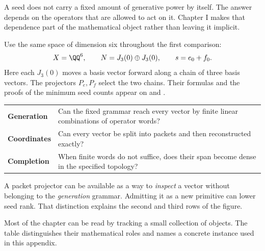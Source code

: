 
A seed does not carry a fixed amount of generative power by itself. The answer depends on the operators that are allowed to act on it. Chapter I makes that dependence part of the mathematical object rather than leaving it implicit.

Use the same space of dimension six throughout the first comparison:
\[
X=\QQ^6,\qquad N=J_3(0)\oplus J_3(0),\qquad
s=e_0+f_0.
\]
Here each $J_3(0)$ moves a basis vector forward along a chain of three basis vectors. The projectors $P_e,P_f$ select the two chains. Their formulas and the proofs of the minimum seed counts appear on  and .


\begin{tabularx}{\linewidth}{@{}p{.18\linewidth}Y@{}}
\textbf{Generation} & Can the fixed grammar reach every vector by finite linear combinations of operator words?\\[4pt]
\textbf{Coordinates} & Can every vector be split into packets and then reconstructed exactly?\\[4pt]
\textbf{Completion} & When finite words do not suffice, does their span become dense in the specified topology?
\end{tabularx}

A packet projector can be available as a way to \emph{inspect} a vector without belonging to the \emph{generation} grammar. Admitting it as a new primitive can lower seed rank. That distinction explains the second and third rows of the figure.


Most of the chapter can be read by tracking a small collection of objects. The table distinguishes their mathematical roles and names a concrete instance used in this appendix.

